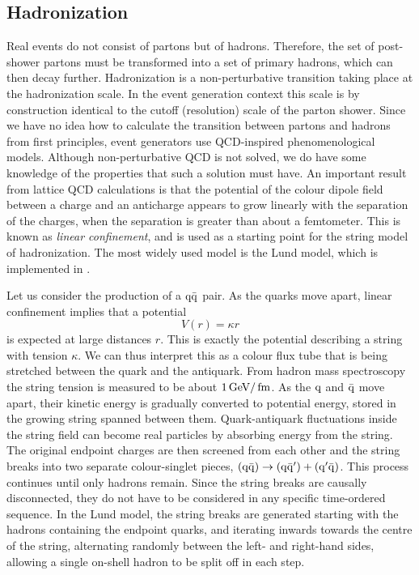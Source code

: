 \subsection{Hadronization \label{sec:event_hadronization}}

Real events do not consist of partons but of hadrons. Therefore, the set of post-shower partons
must be transformed into a set of primary hadrons, which can then decay further. 
Hadronization is a non-perturbative transition taking place at the hadronization scale. In the
event generation context this scale is by construction identical to the cutoff (resolution) scale of
the parton shower.
Since we have no idea how to calculate the transition between partons and hadrons from first
principles, event generators use QCD-inspired phenomenological models.
Although non-perturbative QCD is not solved, we do have some knowledge of the properties
that such a solution must have. 
An important result from lattice QCD calculations is that the potential of the colour dipole field
between a charge and an anticharge appears to grow linearly with the separation of the charges, when
the separation is greater than about a femtometer. This is known as \textit{linear confinement}, and
is used as a starting point for the string model of hadronization.
The most widely used model is the Lund model, which is implemented in \PYTHIA.

Let us consider the production of a $\mathrm{q}\bar{\mathrm{q}}$ pair. As the quarks move apart,
linear confinement implies that a potential
\begin{equation}
  V(r) = \kappa r
\end{equation}
is expected at large distances $r$.  This is exactly the potential describing a
string with tension $\kappa$. We can thus interpret this as a colour flux tube that is being
stretched
between the quark and the antiquark. From hadron mass spectroscopy the string tension is
measured to be about $1\,\text{Ge\hspace{-.08em}V}/\text{\,fm}$.
As the $\mathrm{q}$ and $\bar{\mathrm{q}}$ move apart, their kinetic energy is gradually converted to potential
energy, stored in the growing string spanned between them. 
Quark-antiquark fluctuations inside the string field can become real particles by absorbing energy
from the string. The original endpoint charges are then screened from each other and the
string breaks into two separate colour-singlet pieces, $(\mathrm{q} \bar{\mathrm{q}}) \rightarrow (\mathrm{q}
\bar{\mathrm{q}}') + (\mathrm{q}' \bar{\mathrm{q}})$. This process continues until only hadrons remain.
Since the string breaks are causally disconnected, they do not have to be considered in any
specific time-ordered sequence. In the Lund model, the string breaks are generated starting
with the hadrons containing the endpoint quarks, and iterating inwards towards the centre of the
string, alternating randomly between the left- and right-hand sides, allowing a single on-shell
hadron to be split off in each step. 

